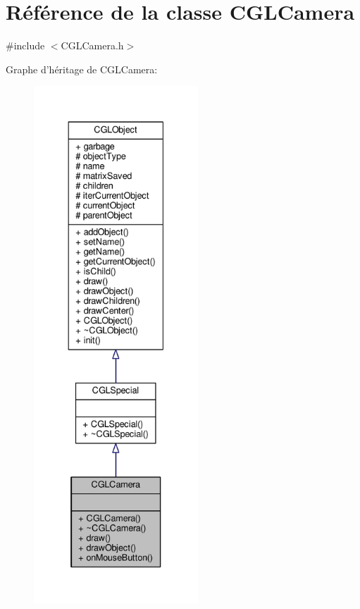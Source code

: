 \hypertarget{class_c_g_l_camera}{\section{Référence de la classe C\-G\-L\-Camera}
\label{class_c_g_l_camera}
}


{\ttfamily \#include $<$C\-G\-L\-Camera.\-h$>$}



Graphe d'héritage de C\-G\-L\-Camera\-:\nopagebreak
\begin{figure}[H]
\begin{center}
\leavevmode
\includegraphics[height=550pt]{d6/d9a/class_c_g_l_camera__inherit__graph}
\end{center}
\end{figure}


